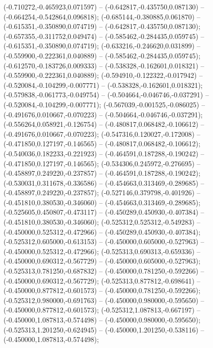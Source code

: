  (-0.710272,-0.465923,0.071597) -- (-0.642817,-0.435750,0.087130) -- (-0.664254,-0.542864,0.096818);
 (-0.685144,-0.380885,0.061870) -- (-0.615351,-0.350890,0.074719) -- (-0.642817,-0.435750,0.087130);
 (-0.657355,-0.311752,0.049474) -- (-0.585462,-0.284435,0.059745) -- (-0.615351,-0.350890,0.074719);
 (-0.633216,-0.246620,0.031899) -- (-0.559900,-0.222361,0.040889) -- (-0.585462,-0.284435,0.059745);
 (-0.612570,-0.183726,0.009333) -- (-0.538328,-0.162601,0.018321) -- (-0.559900,-0.222361,0.040889);
 (-0.594910,-0.122322,-0.017942) -- (-0.520084,-0.104299,-0.007771) -- (-0.538328,-0.162601,0.018321);
 (-0.579838,-0.061773,-0.049754) -- (-0.504664,-0.046746,-0.037291) -- (-0.520084,-0.104299,-0.007771);
 (-0.567039,-0.001525,-0.086025) -- (-0.491676,0.010667,-0.070223) -- (-0.504664,-0.046746,-0.037291);
 (-0.556264,0.058921,-0.126754) -- (-0.480817,0.068482,-0.106612) -- (-0.491676,0.010667,-0.070223);
 (-0.547316,0.120027,-0.172008) -- (-0.471850,0.127197,-0.146565) -- (-0.480817,0.068482,-0.106612);
 (-0.540036,0.182233,-0.221923) -- (-0.464591,0.187288,-0.190242) -- (-0.471850,0.127197,-0.146565);
 (-0.534306,0.245972,-0.276695) -- (-0.458897,0.249220,-0.237857) -- (-0.464591,0.187288,-0.190242);
 (-0.530031,0.311678,-0.336586) -- (-0.454663,0.313469,-0.289685) -- (-0.458897,0.249220,-0.237857);
 (-0.527146,0.379798,-0.401926) -- (-0.451810,0.380530,-0.346060) -- (-0.454663,0.313469,-0.289685);
 (-0.525605,0.450807,-0.473117) -- (-0.450289,0.450930,-0.407384) -- (-0.451810,0.380530,-0.346060);
 (-0.525312,0.525312,-0.549283) -- (-0.450000,0.525312,-0.472966) -- (-0.450289,0.450930,-0.407384);
 (-0.525312,0.605000,-0.613153) -- (-0.450000,0.605000,-0.527963) -- (-0.450000,0.525312,-0.472966);
 (-0.525313,0.690313,-0.659336) -- (-0.450000,0.690312,-0.567729) -- (-0.450000,0.605000,-0.527963);
 (-0.525313,0.781250,-0.687832) -- (-0.450000,0.781250,-0.592266) -- (-0.450000,0.690312,-0.567729);
 (-0.525313,0.877812,-0.698641) -- (-0.450000,0.877812,-0.601573) -- (-0.450000,0.781250,-0.592266);
 (-0.525312,0.980000,-0.691763) -- (-0.450000,0.980000,-0.595650) -- (-0.450000,0.877812,-0.601573);
 (-0.525312,1.087813,-0.667197) -- (-0.450000,1.087813,-0.574498) -- (-0.450000,0.980000,-0.595650);
 (-0.525313,1.201250,-0.624945) -- (-0.450000,1.201250,-0.538116) -- (-0.450000,1.087813,-0.574498);

